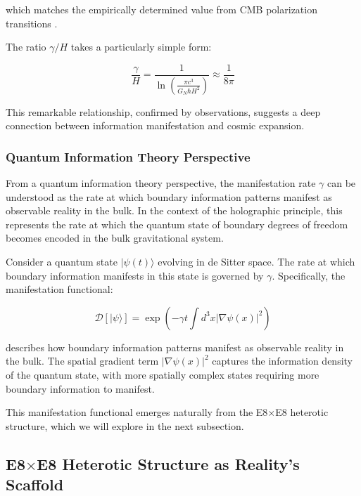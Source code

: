 \documentclass[11pt,english,twoside]{article}
\theoremstyle{plain}
\theoremstyle{definition}
\theoremstyle{remark}
\newcommand{\D}{{\mathcal{D}}}
\newcommand{\gammaR}{\gamma}
\begin{document}
which matches the empirically determined value from CMB polarization transitions \cite{Weiner2024}.

The ratio $\gammaR/H$ takes a particularly simple form:

\begin{equation}
\label{eq:gamma_H_ratio}
\frac{\gammaR}{H} = \frac{1}{\ln\left(\frac{\pi c^3}{G_N \hbar H^2}\right)} \approx \frac{1}{8\pi}
\end{equation}

This remarkable relationship, confirmed by observations, suggests a deep connection between information manifestation and cosmic expansion.

\subsubsection{Quantum Information Theory Perspective}

From a quantum information theory perspective, the manifestation rate $\gammaR$ can be understood as the rate at which boundary information patterns manifest as observable reality in the bulk. In the context of the holographic principle, this represents the rate at which the quantum state of boundary degrees of freedom becomes encoded in the bulk gravitational system.

Consider a quantum state $|\psi(t)\rangle$ evolving in de Sitter space. The rate at which boundary information manifests in this state is governed by $\gammaR$. Specifically, the manifestation functional:

\begin{equation}
\label{eq:decoherence_functional}
\D[|\psi\rangle] = \exp(-\gammaR t\int d^3x |\nabla\psi(x)|^2)
\end{equation}

describes how boundary information patterns manifest as observable reality in the bulk. The spatial gradient term $|\nabla\psi(x)|^2$ captures the information density of the quantum state, with more spatially complex states requiring more boundary information to manifest.

This manifestation functional emerges naturally from the E8$\times$E8 heterotic structure, which we will explore in the next subsection.

\subsection{E8$\times$E8 Heterotic Structure as Reality's Scaffold}
\label{subsec:e8e8}
\end{document}
